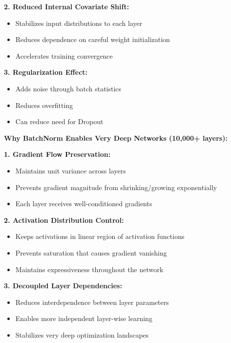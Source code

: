 \documentclass[12pt]{article}
\begin{document}
\begin{enumerate}[(a)]
{    \textbf{2. Reduced Internal Covariate Shift:}
    \begin{itemize}
        \item Stabilizes input distributions to each layer
        \item Reduces dependence on careful weight initialization
        \item Accelerates training convergence
    \end{itemize}
    
    \textbf{3. Regularization Effect:}
    \begin{itemize}
        \item Adds noise through batch statistics
        \item Reduces overfitting
        \item Can reduce need for Dropout
    \end{itemize}
    
    \textbf{Why BatchNorm Enables Very Deep Networks (10,000+ layers):}
    
    \textbf{1. Gradient Flow Preservation:}
    \begin{itemize}
        \item Maintains unit variance across layers
        \item Prevents gradient magnitude from shrinking/growing exponentially
        \item Each layer receives well-conditioned gradients
    \end{itemize}
    
    \textbf{2. Activation Distribution Control:}
    \begin{itemize}
        \item Keeps activations in linear region of activation functions
        \item Prevents saturation that causes gradient vanishing
        \item Maintains expressiveness throughout the network
    \end{itemize}
    
    \textbf{3. Decoupled Layer Dependencies:}
    \begin{itemize}
        \item Reduces interdependence between layer parameters
        \item Enables more independent layer-wise learning
        \item Stabilizes very deep optimization landscapes
    \end{itemize}
    
}
\end{enumerate}
\end{document}
